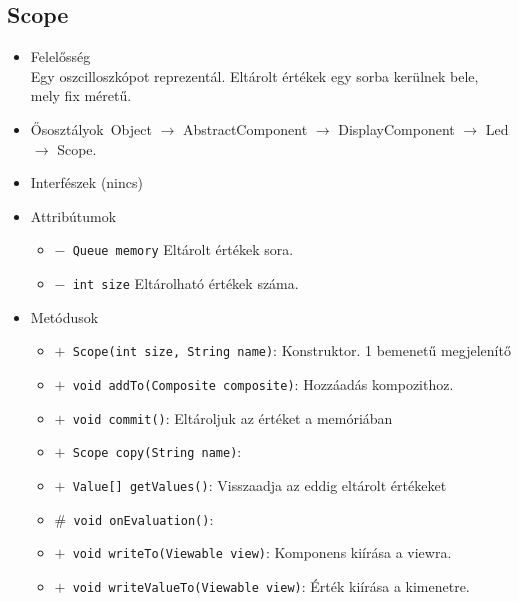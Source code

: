 \subsection{Scope}
\begin{itemize}
\item Felelősség\\
Egy oszcilloszkópot reprezentál. Eltárolt értékek egy sorba kerülnek bele, mely fix méretű.
\item Ősosztályok\ Object $\rightarrow{}$ AbstractComponent $\rightarrow{}$ DisplayComponent $\rightarrow{}$ Led $\rightarrow{}$ Scope.
\item Interfészek (nincs)
\item Attribútumok $\ $
\begin{itemize}
	\item[] \texttt{$-$ Queue memory} Eltárolt értékek sora.
	\item[] \texttt{$-$ int size} Eltárolható értékek száma.
\end{itemize}
\item Metódusok$\ $
\begin{itemize}
	\item[] \texttt{$+$ Scope(int size, String name)}: Konstruktor. 1 bemenetű megjelenítő
	\item[] \texttt{$+$ void addTo(Composite composite)}: Hozzáadás kompozithoz.
	\item[] \texttt{$+$ void commit()}: Eltároljuk az értéket a memóriában
	\item[] \texttt{$+$ Scope copy(String name)}: 
	\item[] \texttt{$+$ Value[] getValues()}: Visszaadja az eddig eltárolt értékeket
	\item[] \texttt{$\#$ void onEvaluation()}: 
	\item[] \texttt{$+$ void writeTo(Viewable view)}: Komponens kiírása a viewra.
	\item[] \texttt{$+$ void writeValueTo(Viewable view)}: Érték kiírása a kimenetre.
\end{itemize}
\end{itemize}

